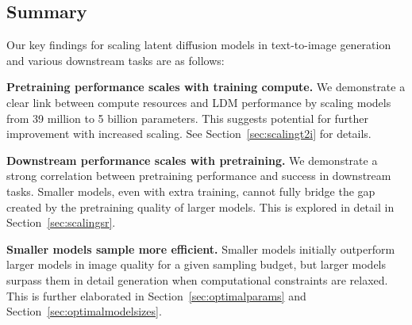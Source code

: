 
\subsection{Summary}
Our key findings for scaling latent diffusion models in text-to-image generation and various downstream tasks are as follows:

\noindent \textbf{Pretraining performance scales with training compute.}
We demonstrate a clear link between compute resources and LDM performance by scaling models from 39 million to 5 billion parameters.  This suggests potential for further improvement with increased scaling. See Section~\ref{sec:scalingt2i} for details.

\noindent \textbf{Downstream performance scales with pretraining.}
We demonstrate a strong correlation between pretraining performance and success in downstream tasks. Smaller models, even with extra training, cannot fully bridge the gap created by the pretraining quality of larger models. 
%
%
This is explored in detail in Section~\ref{sec:scalingsr}.

\noindent \textbf{Smaller models sample more efficient.} 
Smaller models initially outperform larger models in image quality for a given sampling budget, but larger models surpass them in detail generation when computational constraints are relaxed. %
This is further elaborated in Section~\ref{sec:optimalparams} and Section~\ref{sec:optimalmodelsizes}.

